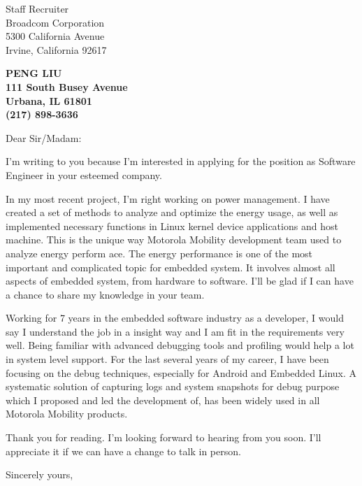 \documentclass[11pt]{letter} %
\begin{document}
\signature{Peng Liu}                  %
\longindentation=0pt                       %
\let\raggedleft\raggedright                %
 
\begin{letter}{Staff Recruiter \\
Broadcom Corporation\\
5300 California Avenue\\
Irvine, California 92617}

\begin{center}
\large\bf PENG LIU\\
111 South Busey Avenue \\ Urbana, IL 61801 \\ (217) 898-3636
\end{center} 

\opening{Dear Sir/Madam:}
 
\noindent I'm writing to you because I'm interested in applying 
for the position as Software Engineer in your esteemed company. 

\noindent In my most recent project, I'm right working on power management. I have created a set of methods to analyze and optimize the energy usage, as well as implemented necessary functions in Linux kernel device applications and host machine. This is the unique way Motorola Mobility development team used to analyze energy perform ace. The energy performance is one of the most important and complicated topic for embedded system. It involves almost all aspects of embedded system, from hardware to software. I'll be glad if I can have a chance to share my knowledge in your team. 

\noindent Working for 7 years in the embedded software industry as a developer, I would say I understand the job in a insight way and I am fit in the requirements very well. Being familiar with advanced debugging tools and profiling would help a lot in system level support. For the last several years of my career, I have been focusing on the debug techniques, especially for Android and Embedded Linux. A systematic solution of capturing logs and system snapshots for debug purpose which I proposed and led the development of, has been widely used in all Motorola Mobility products.

\noindent Thank you for reading. I'm looking forward to hearing from you soon. I'll appreciate it if we can have a change to talk in person. 
 
\closing{Sincerely yours,}
 
 
\encl{}  				%

\end{letter}
 
\end{document}
